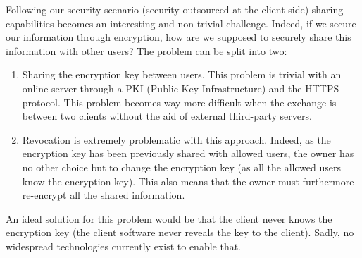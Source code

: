 \documentclass[../main.tex]{subfiles}
\begin{document}
\par Following our security scenario (security outsourced at the client side) sharing capabilities becomes an interesting and non-trivial challenge. Indeed, if we secure our information through encryption, how are we supposed to securely share this information with other users? The problem can be split into two: 
\begin{enumerate}
    \item Sharing the encryption key between users. This problem is trivial with an online server through a PKI (Public Key Infrastructure) and the HTTPS protocol. This problem becomes way more difficult when the exchange is between two clients without the aid of external third-party servers.
    \item Revocation is extremely problematic with this approach. Indeed, as the encryption key has been previously shared with allowed users, the owner has no other choice but to change the encryption key (as all the allowed users know the encryption key). This also means that the owner must furthermore re-encrypt all the shared information.
\end{enumerate}
\par An ideal solution for this problem would be that the client never knows the encryption key (the client software never reveals the key to the client). Sadly, no widespread technologies currently exist to enable that.
\end{document}
